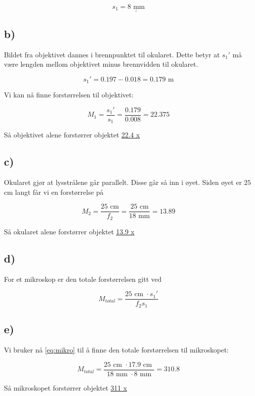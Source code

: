 \documentclass[a4paper,norsk, 10pt]{article}
\begin{document}
\begin{equation}
s_1 = \underline{\underline{8 \text{ mm}}}
\end{equation}

\subsection*{b)}

Bildet fra objektivet dannes i brennpunktet til okularet. Dette betyr at $s_1'$ må være lengden mellom objektivet minus brennvidden til okularet.

\begin{equation}
s_1' = 0.197 - 0.018 = 0.179 \text{ m}
\end{equation}

Vi kan nå finne forstørrelsen til objektivet:

\begin{equation}
M_1 = \frac{s_1'}{s_1} =\frac{0.179}{0.008} = 22.375
\end{equation}

Så objektivet alene forstørrer objektet \underline{\underline{22.4 x}}

\subsection*{c)}

Okularet gjør at lysstrålene går parallelt. Disse går så inn i øyet. Siden øyet er $25$ cm langt får vi en forstørrelse på

\begin{equation}
M_2 = \frac{25 \text{ cm}}{f_2} =  \frac{25 \text{ cm}}{18 \text{ mm}} = 13.89
\end{equation}

Så okularet alene forstørrer objektet \underline{\underline{13.9 x}}

\subsection*{d)}
For et mikroskop er den totale forstørrelsen gitt ved

\begin{equation}
M_{total} = \frac{25 \text{ cm } \cdot s_1'}{f_2 s_1}
\label{eq:mikro}
\end{equation}

\subsection*{e)}

Vi bruker nå \eqref{eq:mikro} til å finne den totale forstørrelsen til mikroskopet:

\begin{equation}
M_{total} = \frac{25 \text{ cm } \cdot 17.9  \text{ cm }}{18  \text{ mm } \cdot 8  \text{ mm}} = 310.8
\end{equation}


Så mikroskopet forstørrer objektet \underline{\underline{311 x}}
\end{document}
